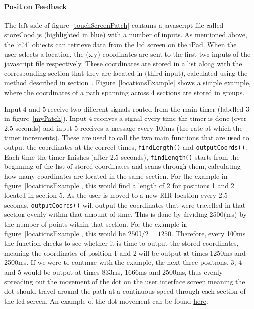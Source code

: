 \documentclass[../../main.tex]{subfiles}
\begin{document}
		\paragraph{Position Feedback}
			The left side of figure~\ref{touchScreenPatch} contains a javascript file called \href{http://lt669.github.io/code/javascript/html/storeCood.html}{storeCood.js} (highlighted in blue) with a number of inputs. As mentioned above, the `c74' objects can retrieve data from the lcd screen on the iPad. When the user selects a location, the (x,y) coordinates are sent to the first two inputs of the javascript file respectively. These coordinates are stored in a list along with the corresponding section that they are located in (third input), calculated using the method described in section~. Figure~\ref{locationsExample} shows a simple example, where the coordinates of a path spanning across 4 sections are stored in groups.

			Input 4 and 5 receive two different signals routed from the main timer (labelled 3 in figure~\ref{myPatch}). Input 4 receives a signal every time the timer is done (ever 2.5 seconds) and input 5 receives a message every 100ms (the rate at which the timer increments). These are used to call the two main functions that are used to output the coordinates at the correct times, \texttt{findLength()} and \texttt{outputCoords()}. Each time the timer finishes (after 2.5 seconds), \texttt{findLength()} starts from the beginning of the list of stored coordinates and scans through them, calculating how many coordinates are located in the same section. For the example in figure~\ref{locationsExample}, this would find a length of 2 for positions 1 and 2 located in section 5. As the user is moved to a new \ac{RIR} location every 2.5 seconds, \texttt{outputCoords()} will output the coordinates that were travelled in that section evenly within that amount of time. This is done by dividing 2500(ms) by the number of points within that section. For the example in figure~\ref{locationsExample}, this would be $2500/2 = 1250$. Therefore, every 100ms the function checks to see whether it is time to output the stored coordinates, meaning the coordinates of position 1 and 2 will be output at times 1250ms and 2500ms. If we were to continue with the example, the next three positions, 3, 4 and 5 would be output at times 833ms, 1666ms and 2500ms, thus evenly spreading out the movement of the dot on the user interface screen meaning the dot should travel around the path at a continuous speed through each section of the lcd screen. An example of the dot movement can be found \href{http://lt669.github.io/pages/videos.html}{here}.
\end{document}
